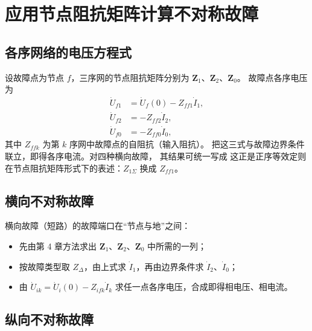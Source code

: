 \section{应用节点阻抗矩阵计算不对称故障}

\subsection{各序网络的电压方程式}

设故障点为节点 $f$，三序网的节点阻抗矩阵分别为 $\boldsymbol Z_1$、$\boldsymbol Z_2$、$\boldsymbol Z_0$。
故障点各序电压为
\begin{align}
  \dot U_{f1}&=\dot U_f(0)-Z_{ff1}\dot I_1,\\
  \dot U_{f2}&=-Z_{ff2}\dot I_2,\\
  \dot U_{f0}&=-Z_{ff0}\dot I_0,
\end{align}
其中 $Z_{ffk}$ 为第 $k$ 序网中故障点的自阻抗（输入阻抗）。
把这三式与故障边界条件联立，即得各序电流。对四种横向故障，
其结果可统一写成
这正是正序等效定则在节点阻抗矩阵形式下的表述：$Z_{1\Sigma}$ 换成 $Z_{ff1}$。

\subsection{横向不对称故障}

横向故障（短路）的故障端口在“节点与地”之间：
\begin{itemize}
  \item 先由第 4 章方法求出 $\boldsymbol Z_1$、$\boldsymbol Z_2$、$\boldsymbol Z_0$ 中所需的一列；
  \item 按故障类型取 $Z_\Delta$，由上式求 $\dot I_1$，再由边界条件求 $\dot I_2$、$\dot I_0$；
  \item 由 $\dot U_{ik}=\dot U_i(0)-Z_{ifk}\dot I_k$ 求任一点各序电压，合成即得相电压、相电流。
\end{itemize}

\subsection{纵向不对称故障}

